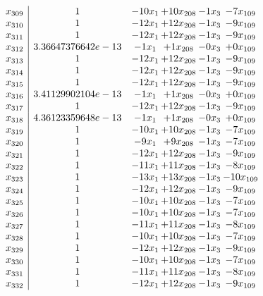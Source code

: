 \documentclass[11pt]{article}
\begin{document}
\[\begin{array}{c| c c@{\hskip 2pt} c@{\hskip 2pt} c@{\hskip 2pt} c@{\hskip 2pt} }
 x_{309}   &  1 & -10 x_{1} & + 10 x_{208} & -1 x_{3} & -7 x_{109}\\
 x_{310}   &  1 & -12 x_{1} & + 12 x_{208} & -1 x_{3} & -9 x_{109}\\
 x_{311}   &  1 & -12 x_{1} & + 12 x_{208} & -1 x_{3} & -9 x_{109}\\
 x_{312}   &  3.36647376642e-13 & -1 x_{1} & + 1 x_{208} & -0 x_{3} & + 0 x_{109}\\
 x_{313}   &  1 & -12 x_{1} & + 12 x_{208} & -1 x_{3} & -9 x_{109}\\
 x_{314}   &  1 & -12 x_{1} & + 12 x_{208} & -1 x_{3} & -9 x_{109}\\
 x_{315}   &  1 & -12 x_{1} & + 12 x_{208} & -1 x_{3} & -9 x_{109}\\
 x_{316}   &  3.41129902104e-13 & -1 x_{1} & + 1 x_{208} & -0 x_{3} & + 0 x_{109}\\
 x_{317}   &  1 & -12 x_{1} & + 12 x_{208} & -1 x_{3} & -9 x_{109}\\
 x_{318}   &  4.36123359648e-13 & -1 x_{1} & + 1 x_{208} & -0 x_{3} & + 0 x_{109}\\
 x_{319}   &  1 & -10 x_{1} & + 10 x_{208} & -1 x_{3} & -7 x_{109}\\
 x_{320}   &  1 & -9 x_{1} & + 9 x_{208} & -1 x_{3} & -7 x_{109}\\
 x_{321}   &  1 & -12 x_{1} & + 12 x_{208} & -1 x_{3} & -9 x_{109}\\
 x_{322}   &  1 & -11 x_{1} & + 11 x_{208} & -1 x_{3} & -8 x_{109}\\
 x_{323}   &  1 & -13 x_{1} & + 13 x_{208} & -1 x_{3} & -10 x_{109}\\
 x_{324}   &  1 & -12 x_{1} & + 12 x_{208} & -1 x_{3} & -9 x_{109}\\
 x_{325}   &  1 & -10 x_{1} & + 10 x_{208} & -1 x_{3} & -7 x_{109}\\
 x_{326}   &  1 & -10 x_{1} & + 10 x_{208} & -1 x_{3} & -7 x_{109}\\
 x_{327}   &  1 & -11 x_{1} & + 11 x_{208} & -1 x_{3} & -8 x_{109}\\
 x_{328}   &  1 & -10 x_{1} & + 10 x_{208} & -1 x_{3} & -7 x_{109}\\
 x_{329}   &  1 & -12 x_{1} & + 12 x_{208} & -1 x_{3} & -9 x_{109}\\
 x_{330}   &  1 & -10 x_{1} & + 10 x_{208} & -1 x_{3} & -7 x_{109}\\
 x_{331}   &  1 & -11 x_{1} & + 11 x_{208} & -1 x_{3} & -8 x_{109}\\
 x_{332}   &  1 & -12 x_{1} & + 12 x_{208} & -1 x_{3} & -9 x_{109}\\

\end{array}\]
\end{document}
